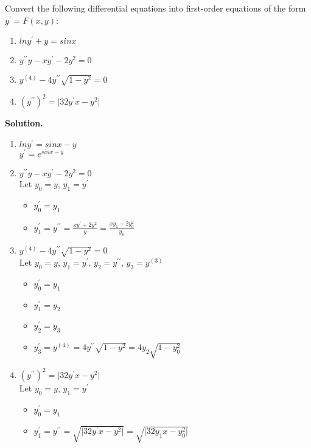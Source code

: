 \begin{exercise}{4} %
Convert the following differential equations into first-order equations of the
form \textbf{$y^\prime = F(x, y)$}:
\begin{enumerate}
\item $ ln y^\prime + y = sin x$
\item $ y^{\prime\prime}y - xy^\prime - 2y^2 = 0$
\item $ y^{(4)} - 4y^{\prime\prime} \sqrt{1-y^2} = 0$
\item $ (y^{\prime\prime})^2 = \vert 32y^\prime x - y^2 \vert$ 
\end{enumerate}

\textbf{Solution.}
\begin{enumerate}
    \item $lny^\prime = sinx-y$ \\
    $y^\prime = e^{sinx-y}$
    \item $ y^{\prime\prime}y - xy^\prime - 2y^2 = 0$\\
    Let $y_0=y$, $y_1=y^\prime$
    \begin{itemize}
        \item $y^\prime_0=y_1$
        \item $y^\prime_1=y^{\prime\prime}=\frac{xy^\prime+2y^2}{y}=\frac{xy_1+2y_0^2}{y_0}$
    \end{itemize}
    \item $ y^{(4)} - 4y^{\prime\prime} \sqrt{1-y^2} = 0$ \\
    Let $y_0=y$, $y_1=y^\prime$, $y_2=y^{\prime\prime}$, $y_3=y^{(3)}$
    \begin{itemize}
        \item $y^\prime_0=y_1$
        \item $y^\prime_1=y_2$
        \item $y^\prime_2=y_3$
        \item $y^\prime_3=y^{(4)}=4y^{\prime\prime}\sqrt{1-y^2}=4y_2\sqrt{1-y_0^2}$
    \end{itemize}    
    \item $ (y^{\prime\prime})^2 = \vert 32y^\prime x - y^2 \vert$  \\
    Let $y_0=y$, $y_1=y^\prime$
    \begin{itemize}
        \item $y^\prime_0=y_1$
        \item $y^\prime_1=y^{\prime\prime}=\sqrt{\vert 32y^\prime x - y^2 \vert}=\sqrt{\vert 32y_1 x - y_0^2 \vert}$
    \end{itemize}    
\end{enumerate}

\end{exercise}


